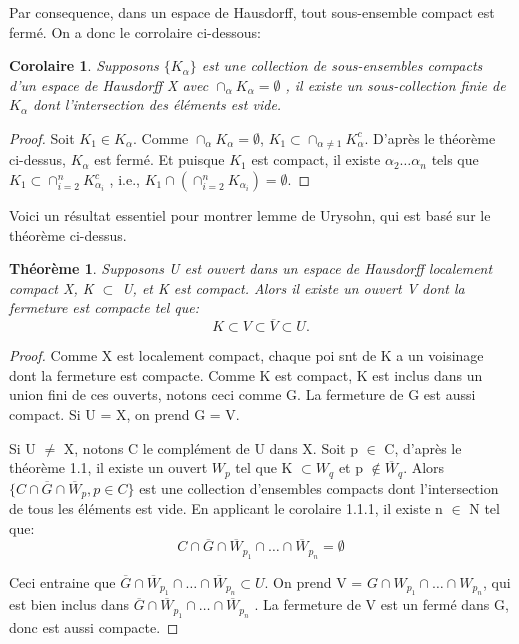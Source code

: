 \documentclass{article}
\newtheorem{theorem}{Théorème}[section]
\newtheorem{corollary}{Corolaire}[theorem]
\begin{document}
Par consequence, dans un espace de Hausdorff, tout sous-ensemble compact est fermé. On a donc le corrolaire ci-dessous:

\begin{corollary}
Supposons $\{ K_{\alpha } \} $ est une collection de sous-ensembles compacts d'un espace de Hausdorff X avec $\cap_{\alpha }K_{\alpha}=\emptyset$ , il existe un sous-collection finie de ${K_{\alpha }}$ dont l'intersection des éléments est vide.
\end{corollary}

\begin{proof}
    Soit $K_{1} \in {K_{\alpha}}$. Comme $\cap_{\alpha }K_{\alpha}=\emptyset$, $K_{1} \subset \cap_{\alpha \neq 1}K_{\alpha}^{c}$. D'après le théorème ci-dessus, $K_{\alpha}$ est fermé. Et puisque $K_{1}$ est compact, il existe $\alpha_{2} \dots \alpha_{n}$ tels que $K_{1} \subset \cap_{i=2}^n  K_{\alpha_{i}}^{c}$ , i.e., $K_{1} \cap (\cap_{i = 2}^{n} K_{\alpha_{i}} ) = \emptyset$.
\end{proof}

Voici un résultat essentiel pour montrer lemme de Urysohn, qui est basé sur le théorème ci-dessus.
\begin{theorem}
      Supposons U est ouvert dans un espace de Hausdorff localement compact X, K $\subset$ U, et K est compact. Alors il existe un ouvert V dont la fermeture est compacte tel que: 
      \[K \subset V \subset \overline{V} \subset U.\] 
\end{theorem}


\begin{proof}
     Comme X est localement compact, chaque poi snt de K a un voisinage dont la fermeture est compacte. Comme K est compact, K est inclus dans un union fini de ces ouverts, notons ceci comme G. La fermeture de G est aussi compact. Si U = X, on prend G = V.\par
     Si U $\neq$ X, notons C le complément de U dans X. Soit p $\in$ C, d'après le théorème 1.1, il existe un ouvert $W_{p}$ tel que K $\subset W_{q}$ et p $\notin \overline{W}_{q}$.
     Alors $\{C \cap \overline{G} \cap \overline{W}_{p}, p \in C \}$ est une collection d'ensembles compacts dont l'intersection de tous les éléments est vide. En applicant le corolaire 1.1.1, il existe n $\in$ N tel que: 
    \[C  \cap  \overline{G}  \cap \overline{W}_{p_{1}} \cap \dots \cap \overline{W}_{p_{n}}= \emptyset\]\par
    Ceci entraine que $\overline{G}  \cap \overline{W}_{p_{1}} \cap \dots \cap \overline{W}_{p_{n}} \subset U$. On prend V = $G  \cap W_{p_{1}} \cap \dots \cap {W}_{p_{n}}$, qui est bien inclus dans $\overline{G}  \cap \overline{W}_{p_{1}} \cap \dots \cap \overline{W}_{p_{n}}$ . La fermeture de V est un fermé dans G, donc est aussi compacte. 

\end{proof}
\end{document}
